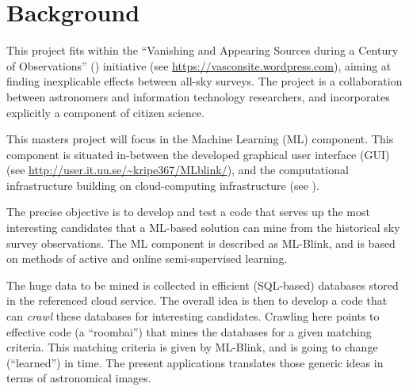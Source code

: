 \section{Background} \label{background}

This project fits within the ``Vanishing and Appearing Sources during a Century of Observations'' (\vasco) initiative (see \url{https://vasconsite.wordpress.com}), aiming at finding inexplicable effects between all-sky surveys. The \vasco project is a collaboration between astronomers and information technology researchers, and incorporates explicitly a component of citizen science.

This masters project will focus in the Machine Learning (ML) component. This component is situated in-between the developed graphical user interface (GUI) (see \url{http://user.it.uu.se/~kripe367/MLblink/}), and the computational infrastructure building on cloud-computing infrastructure (see ).

The precise objective is to develop and test a code that serves up the most interesting candidates that a ML-based solution can mine from the historical sky survey observations. The ML component is described as ML-Blink, and is based on methods of active and online semi-supervised learning.

The huge data to be mined is collected in efficient (SQL-based) databases stored in the referenced cloud service. The overall idea is then to develop a code that can {\em crawl} these databases for interesting candidates. Crawling here points to effective code (a ``roombai'') that mines the databases for a given matching criteria. This matching criteria is given by ML-Blink, and is going to change (``learned'') in time. The present applications translates those generic ideas in terms of astronomical images.